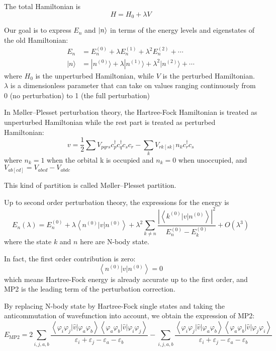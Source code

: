 The total Hamiltonian is
$$
H=H_{0}+\lambda V
$$

Our goal is to express $E_n$ and $\ket{n}$  in terms of the energy levels and eigenstates of the old Hamiltonian:
\begin{align*}
	E_{n}&=E_{n}^{(0)}+\lambda E_{n}^{(1)}+\lambda^{2} E_{n}^{(2)}+\cdots
	\\
	| n \rangle&=| n^{(0)} \rangle+\lambda | n^{(1)} \rangle+\lambda^{2} | n^{(2)} \rangle+\cdots
\end{align*}
where $H_0$ is the unperturbed Hamiltonian, while $V$ is the perturbed Hamiltonian.
$\lambda$ is a dimensionless parameter that can take on values ranging continuously from 0 (no perturbation) to 1 (the full perturbation)

In M{\o}ller–Plesset perturbation theory, the Hartree-Fock Hamiltonian is treated as unperturbed Hamiltonian while the rest part is treated as perturbed Hamiltonian:
$$
v=\frac{1}{2} \sum V_{p q r s} c_{p}^{\dagger} c_{q}^{\dagger} c_{s} c_{r}-\sum_{k} V_{r k[s k]} n_{k} c_{r}^{\dagger} c_{s}
$$
where $n_k=1$ when the orbital k is occupied and $n_k=0$ when unoccupied, and $V_{ab[cd]}=V_{abcd}-V_{abdc}$

This kind of partition is called M{\o}ller–Plesset partition.

Up to second order perturbation theory, the expressions for the energy is
$$
E_{n}(\lambda)=E_{n}^{(0)}+\lambda\left\langle n^{(0)}|v| n^{(0)}\right\rangle+\lambda^{2} \sum_{k \neq n} \frac{\left|\left\langle k^{(0)}|v| n^{(0)}\right\rangle\right|^{2}}{E_{n}^{(0)}-E_{k}^{(0)}}+O\left(\lambda^{3}\right)
$$
where the state $k$ and $n$ here are N-body state.

In fact, the first order contribution is zero:
$$
\left\langle n^{(0)}|v| n^{(0)}\right\rangle=0
$$
which means Hartree-Fock energy is already accurate up to the first order, and MP2 is the leading term of the perturbation correction.

By replacing N-body state by Hartree-Fock single states and taking the anticommutation of wavefunction into account, we obtain the expression of MP2:
$$
E_{\mathrm{MP} 2}=2 \sum_{i, j, a, b} \frac{\left\langle\varphi_{i} \varphi_{j}|\hat{v}| \varphi_{a} \varphi_{b}\right\rangle\left\langle\varphi_{a} \varphi_{b}|\hat{v}| \varphi_{i} \varphi_{j}\right\rangle}{\varepsilon_{i}+\varepsilon_{j}-\varepsilon_{a}-\varepsilon_{b}}-\sum_{i, j, a, b} \frac{\left\langle\varphi_{i} \varphi_{j}|\hat{v}| \varphi_{a} \varphi_{b}\right\rangle\left\langle\varphi_{a} \varphi_{b}|\hat{v}| \varphi_{j} \varphi_{i}\right\rangle}{\varepsilon_{i}+\varepsilon_{j}-\varepsilon_{a}-\varepsilon_{b}}
$$

